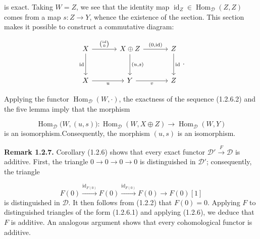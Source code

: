 \clearpage
{}%
\begingroup
\small
\setlength{\abovedisplayskip}{4pt plus 2pt minus 2pt}%
\setlength{\belowdisplayskip}{4pt plus 2pt minus 2pt}%

is exact. Taking $W=Z$, we see that the identity map
$\operatorname{id}_Z\in\operatorname{Hom}_{\mathcal D}(Z,Z)$ comes from a map
$s\colon Z\longrightarrow Y$, whence the existence of the section. This
section makes it possible to construct a commutative diagram:

\begin{equation*}
  \begin{tikzcd}[column sep=3.5em,row sep=3.0em]
    X \arrow[r,"{\binom{\operatorname{id}}{0}}"]
      \arrow[d,"{\operatorname{id}}"']
      & X\oplus Z \arrow[r,"{(0,\operatorname{id})}"]
        \arrow[d,"{(u,s)}"]
      & Z \arrow[d,"{\operatorname{id}}"] \\
    X \arrow[r,"u"'] & Y \arrow[r,"v"'] & Z
  \end{tikzcd}\,.
\end{equation*}

Applying the functor $\operatorname{Hom}_{\mathcal D}(W,\mathord\cdot)$, the
exactness of the sequence (1.2.6.2) and the five lemma imply that the
morphism

\[
  \operatorname{Hom}_{\mathcal D}\bigl(W,(u,s)\bigr)\colon
  \operatorname{Hom}_{\mathcal D}(W,X\oplus Z)
  \longrightarrow \operatorname{Hom}_{\mathcal D}(W,Y)
\]
is an isomorphism.\space Consequently, the morphism $(u,s)$ is an isomorphism.

\medskip
\noindent\textbf{Remark 1.2.7.}\quad
Corollary (1.2.6) shows that every exact functor
$\mathcal D'\xrightarrow{F}\mathcal D$ is additive. First, the triangle
$0\longrightarrow0\longrightarrow0\longrightarrow0$ is distinguished in
$\mathcal D'$; consequently, the triangle

\[
  F(0)\xrightarrow{\operatorname{id}_{F(0)}}F(0)
  \xrightarrow{\operatorname{id}_{F(0)}}F(0)
  \longrightarrow F(0)[1]
\]
is distinguished in $\mathcal D$. It then follows from (1.2.2) that
$F(0)=0$. Applying $F$ to distinguished triangles of the form (1.2.6.1)
and applying (1.2.6), we deduce that $F$ is additive. An analogous argument
shows that every cohomological functor is additive.

